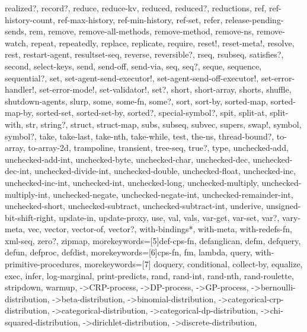 {{    realized?, record?, reduce, reduce-kv, reduced, reduced?, reductions, ref, %
    ref-history-count, ref-max-history, ref-min-history, ref-set, refer, %
    release-pending-sends, rem, remove, remove-all-methods, remove-method, %
    remove-ns, remove-watch, repeat, repeatedly, replace, replicate, require, %
    reset!, reset-meta!, resolve, rest, restart-agent, resultset-seq, reverse, %
    reversible?, rseq, rsubseq, satisfies?, second, select-keys, send, send-off, %
    send-via, seq, seq?, seque, sequence, sequential?, set, %
    set-agent-send-executor!, set-agent-send-off-executor!, set-error-handler!, %
    set-error-mode!, set-validator!, set?, short, short-array, shorts, shuffle, %
    shutdown-agents, slurp, some, some-fn, some?, sort, sort-by, sorted-map, %
    sorted-map-by, sorted-set, sorted-set-by, sorted?, special-symbol?, spit, %
    split-at, split-with, str, string?, struct, struct-map, subs, subseq, %
    subvec, supers, swap!, symbol, symbol?, take, take-last, take-nth, %
    take-while, test, the-ns, thread-bound?, to-array, to-array-2d, trampoline, %
    transient, tree-seq, true?, type, unchecked-add, unchecked-add-int, %
    unchecked-byte, unchecked-char, unchecked-dec, unchecked-dec-int, %
    unchecked-divide-int, unchecked-double, unchecked-float, unchecked-inc, %
    unchecked-inc-int, unchecked-int, unchecked-long, unchecked-multiply, %
    unchecked-multiply-int, unchecked-negate, unchecked-negate-int, %
    unchecked-remainder-int, unchecked-short, unchecked-subtract, %
    unchecked-subtract-int, underive, unsigned-bit-shift-right, update-in, %
    update-proxy, use, val, vals, var-get, var-set, var?, vary-meta, vec, %
    vector, vector-of, vector?, with-bindings*, with-meta, with-redefs-fn, %
    xml-seq, zero?, zipmap}, %
  morekeywords=[5]{def-cps-fn, defanglican, defm, defquery, defun, defproc, defdist}, %
  morekeywords=[6]{cps-fn, fm, lambda, query, with-primitive-procedures}, %
  morekeywords=[7]{%
    doquery, %
    conditional, %
    collect-by, equalize, exec, infer, log-marginal, print-predicts, %
    rand, rand-int, rand-nth, rand-roulette, stripdown, warmup, %
    ->CRP-process, ->DP-process, ->GP-process, %
    ->bernoulli-distribution, ->beta-distribution, ->binomial-distribution, %
    ->categorical-crp-distribution, ->categorical-distribution, %
    ->categorical-dp-distribution, ->chi-squared-distribution, %
    ->dirichlet-distribution, ->discrete-distribution, %
}}
